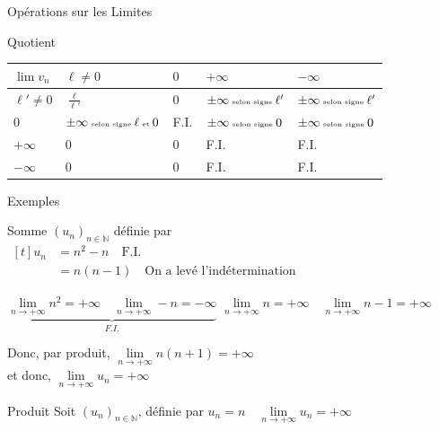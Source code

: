 \documentclass{coursbook}
\begin{document}
\begin{Gpartie}{Opérations sur les Limites}
\begin{Spartie}{Quotient}
\begin{table}[H]
{\begin{tabular}{ p{0.15\linewidth} *{4}{M{0.17\linewidth} }}
                        $\lim v_n$      & $\ell\neq0$                                                   & $0$ & $+\infty$                                   & $-\infty$                                     \\ \midrule
                        $\ell'\neq 0$   & $\frac{\ell}{\ell'}$                                          & $0$ & $\pm\infty\text{\tiny{ selon signe }}\ell'$ & $\pm\infty\text{\tiny{ selon signe }}\ell'$   \\ 
                        $0$             & $\pm\infty\text{\tiny{ selon signe }}\ell\text{\tiny{ et }}0$ & F.I.& $\pm\infty\text{\tiny{ selon signe }}0$     & $\pm\infty\text{\tiny{ selon signe }}0$       \\
                        $+\infty$       & $0$                                                           & $0$ & F.I.                                        & F.I.                                          \\ 
                        $-\infty$       & $0$                                                           & $0$ & F.I.                                        & F.I.                                          \\ \bottomrule
                    \end{tabular}
                }
            \end{table}
        \end{Spartie}
        \begin{Spartie}{Exemples} 
            \begin{SSpartie}{Somme} 
                $(u_n)_{n\in\mathbb{N}}$ définie par $\begin{aligned}[t]u_n&=n^2-n\quad\text{F.I.} \\ &=n(n-1)\quad\text{On a levé l'indétermination}\end{aligned}$

                $\underbrace{\lim\limits_{n\to +\infty}n^2=+\infty\quad\lim\limits_{n\to +\infty}-n=-\infty}_{F.I.}$
                \qquad$\lim\limits_{n\to +\infty}n=+\infty\quad\lim\limits_{n\to +\infty}n-1=+\infty$

                Donc, par produit, $\lim\limits_{n\to +\infty}n(n+1)=+\infty$ \\ et donc, $\lim\limits_{n\to +\infty}u_n=+\infty$
            \end{SSpartie}
            \begin{SSpartie}{Produit} 
                Soit $(u_n)_{n\in\mathbb{N}}$, définie par $u_n=n\quad\lim\limits_{n\to +\infty}u_n=+\infty$


\end{SSpartie}
\end{Spartie}
\end{Gpartie}
\end{document}
